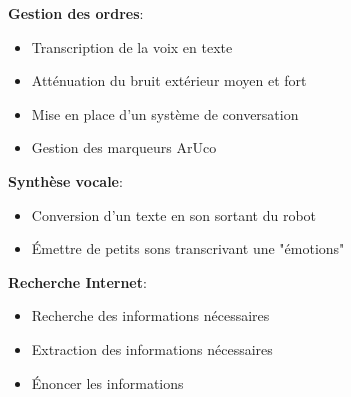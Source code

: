 \textbf{Gestion des ordres}:
\begin{itemize}
    \item Transcription de la voix en texte
    \item Atténuation du bruit extérieur moyen et fort
    \item Mise en place d'un système de conversation
    \item Gestion des marqueurs ArUco \\
\end{itemize}
\textbf{Synthèse vocale}:
\begin{itemize}
    \item Conversion d'un texte en son sortant du robot
    \item Émettre de petits sons transcrivant une "émotions"\\
\end{itemize}
\textbf{Recherche Internet}:
\begin{itemize}
    \item Recherche des informations nécessaires
    \item Extraction des informations nécessaires
    \item Énoncer les informations \\ 
\end{itemize}
\newpage
